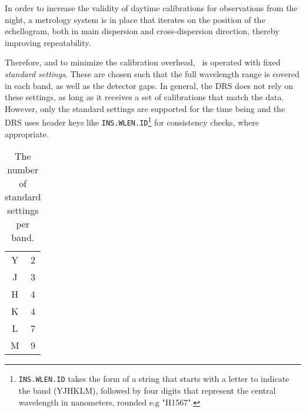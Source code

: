 In order to increase the validity of daytime calibrations for observations from
the night, a metrology system is in place that iterates on the position of the
echellogram, both in main dispersion and cross-dispersion direction, thereby
improving repeatability.

Therefore, and to minimize the calibration overhead, \instrument\ is operated
with fixed \emph{standard settings}. These are chosen such that the full
wavelength range is covered in each band, as well as the detector gaps. In
general, the DRS does not rely on these settings, as long as it receives a set
of calibrations that match the data. However, only the standard settings are
supported for the time being and the DRS uses header keys like
\texttt{INS.WLEN.ID}\footnote{\texttt{INS.WLEN.ID} takes the form of a string
that starts with a letter to indicate the band (YJHKLM), followed by four digits
that represent the central wavelength in nanometers, rounded e.g "H1567".} for consistency checks, where
appropriate.


\begin{table}[htbp]
  \centering\begin{tabular}{cc}
  Y  & 2\\
  J  & 3\\
  H  & 4\\
  K  & 4\\
  L  & 7\\
  M  & 9\\
  \end{tabular}
  \caption{The number of standard settings per band.}
  \label{tab:nsettings}
\end{table}
